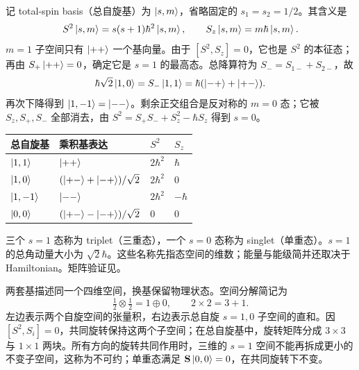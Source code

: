 记 total-spin basis（总自旋基）为 $\left|s,m\right\rangle$，省略固定的 $s_1=s_2=1/2$。其含义是
\begin{equation}
  S^2\left|s,m\right\rangle=s(s+1)\hbar^2\left|s,m\right\rangle,\qquad
  S_z\left|s,m\right\rangle=m\hbar\left|s,m\right\rangle.
\end{equation}
$m=1$ 子空间只有 $\left|++\right\rangle$ 一个基向量。由于 $[S^2,S_z]=0$，它也是 $S^2$ 的本征态；再由 $S_+\left|++\right\rangle=0$，确定它是 $s=1$ 的最高态。总降算符为 $S_-=S_{1-}+S_{2-}$，故
\begin{equation}
  \hbar\sqrt2\left|1,0\right\rangle=S_-\left|1,1\right\rangle
    =\hbar(\left|-+\right\rangle+\left|+-\right\rangle).
\end{equation}
再次下降得到 $\left|1,-1\right\rangle=\left|--\right\rangle$。剩余正交组合是反对称的 $m=0$ 态；它被 $S_z,S_+,S_-$ 全部消去，由 $S^2=S_+S_-+S_z^2-\hbar S_z$ 得到 $s=0$。

\begin{center}
\renewcommand{\arraystretch}{1.25}
\begin{tabular}{@{}llll@{}}
  \toprule
  总自旋基 & 乘积基表达 & $S^2$ & $S_z$ \\
  \midrule
  $\left|1,1\right\rangle$ & $\left|++\right\rangle$ & $2\hbar^2$ & $\hbar$ \\
  $\left|1,0\right\rangle$ & $(\left|+-\right\rangle+\left|-+\right\rangle)/\sqrt2$ & $2\hbar^2$ & $0$ \\
  $\left|1,-1\right\rangle$ & $\left|--\right\rangle$ & $2\hbar^2$ & $-\hbar$ \\
  $\left|0,0\right\rangle$ & $(\left|+-\right\rangle-\left|-+\right\rangle)/\sqrt2$ & $0$ & $0$ \\
  \bottomrule
\end{tabular}
\end{center}
三个 $s=1$ 态称为 triplet（三重态），一个 $s=0$ 态称为 singlet（单重态）。$s=1$ 的总角动量大小为 $\sqrt2\hbar$。这些名称先指态空间的维数；能量与能级简并还取决于 Hamiltonian。矩阵验证见。

两套基描述同一个四维空间，换基保留物理状态。空间分解简记为
\begin{equation}
  \boxed{\tfrac12\otimes\tfrac12=1\oplus0,\qquad
    2\times2=3+1.}
\end{equation}
左边表示两个自旋空间的张量积，右边表示总自旋 $s=1,0$ 子空间的直和。因 $[S^2,S_i]=0$，共同旋转保持这两个子空间；在总自旋基中，旋转矩阵分成 $3\times3$ 与 $1\times1$ 两块。所有方向的旋转共同作用时，三维的 $s=1$ 空间不能再拆成更小的不变子空间，这称为不可约；单重态满足 $\mathbf S\left|0,0\right\rangle=0$，在共同旋转下不变。

